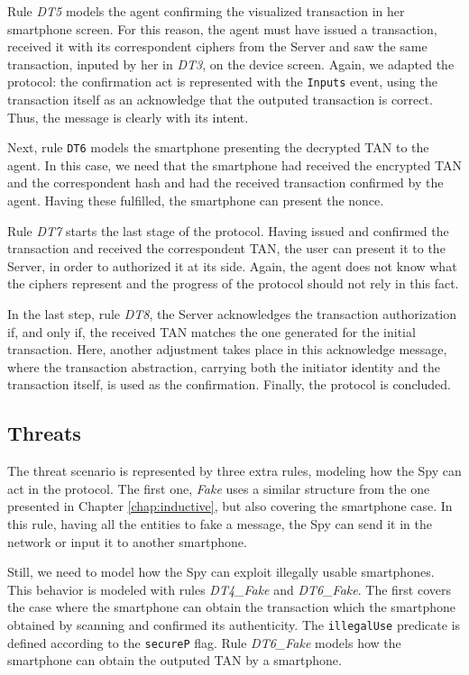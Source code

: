 Rule \textit{DT5} models the agent confirming the visualized transaction in her smartphone screen. For this reason, the agent must have issued a transaction, received it with its correspondent ciphers from the Server and saw the same transaction, inputed by her in \textit{DT3}, on the device screen. Again, we adapted the protocol: the confirmation act is represented with the \texttt{Inputs} event, using the transaction itself as an acknowledge that the outputed transaction is correct. Thus, the message is clearly with its intent.

Next, rule \texttt{DT6} models the smartphone presenting the decrypted TAN to the agent. In this case, we need that the smartphone had received the encrypted TAN and the correspondent hash and had the received transaction confirmed by the agent. Having these fulfilled, the smartphone can present the nonce.

Rule \textit{DT7} starts the last stage of the protocol. Having issued and confirmed the transaction and received the correspondent TAN, the user can present it to the Server, in order to authorized it at its side. Again, the agent does not know what the ciphers represent and the progress of the protocol should not rely in this fact.

In the last step, rule \textit{DT8}, the Server acknowledges the transaction authorization if, and only if, the received TAN matches the one generated for the initial transaction. Here, another adjustment takes place in this acknowledge message, where the transaction abstraction, carrying both the initiator identity and the transaction itself, is used as the confirmation. Finally, the protocol is concluded.


\subsection{Threats}
The threat scenario is represented by three extra rules, modeling how the Spy can act in the protocol. The first one, \textit{Fake} uses a similar structure from the one presented in Chapter \ref{chap:inductive}, but also covering the smartphone case. In this rule, having all the entities to fake a message, the Spy can send it in the network or input it to another smartphone.

Still, we need to model how the Spy can exploit illegally usable smartphones. This behavior is modeled with rules \textit{DT4\_Fake} and \textit{DT6\_Fake}. The first covers the case where the smartphone can obtain the transaction which the smartphone obtained by scanning and confirmed its authenticity. The \texttt{illegalUse} predicate is defined according to the \texttt{secureP} flag. Rule \textit{DT6\_Fake} models how the smartphone can obtain the outputed TAN by a smartphone.


